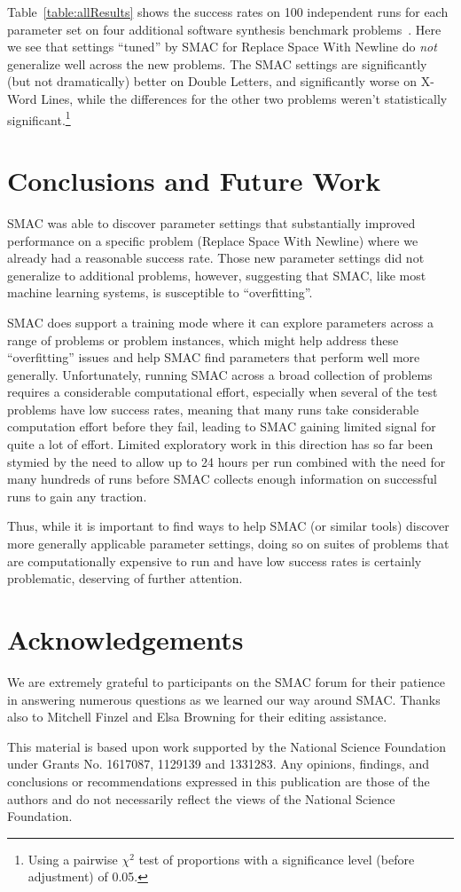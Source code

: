 Table~\ref{table:allResults} shows the success rates on 100 independent runs
for each parameter set on four additional software synthesis benchmark
problems~\cite{Helmuth:2015:GECCO}. Here we see that settings
``tuned'' by SMAC for Replace Space With Newline do \emph{not} generalize
well across the new problems. The SMAC settings are significantly
(but not dramatically) better on
Double Letters, and significantly worse on X-Word Lines, while the differences for
the other two problems weren't statistically significant.\footnote{Using a
	pairwise $\chi^2$ test of proportions with a significance level (before
	adjustment) of 0.05.}

\section{Conclusions and Future Work}
\label{sec:conclusions}

SMAC was able to discover parameter settings that substantially improved
performance on a specific problem (Replace Space With Newline) where we already
had a reasonable success rate. Those new parameter settings did not generalize
to additional problems, however, suggesting that SMAC, like most machine
learning systems, is susceptible to ``overfitting''.

SMAC does support a training mode where it can explore parameters across a range
of problems or problem instances, which might help address these ``overfitting''
issues and help SMAC find parameters that perform well more generally.
Unfortunately, running SMAC across a broad
collection of problems requires a considerable computational effort, 
especially when several of the test problems have low success rates, meaning
that many runs take considerable computation effort before they fail, leading
to SMAC gaining limited signal for quite a lot of effort. Limited
exploratory work in this direction has so far been stymied by the need to allow
up to 24 hours per run combined with the need for many hundreds of runs before
SMAC collects enough information on successful runs to gain any traction.

Thus, while it is important to find ways to help SMAC (or similar tools)
discover more generally applicable parameter settings, doing so on suites 
of problems that are computationally expensive to run and have low success rates is certainly problematic, deserving of further attention.

\section*{Acknowledgements}
\label{sec:acknowledgements}

We are extremely grateful to participants on the SMAC forum for their patience
in answering numerous questions as we learned our way around
SMAC. Thanks also to Mitchell Finzel and Elsa Browning for their editing assistance.

This material is based upon work supported by the National Science Foundation under Grants No. 1617087, 1129139 and 1331283. Any opinions, findings, and conclusions or recommendations expressed in this publication are those of the authors and do not necessarily reflect the views of the National Science Foundation.
